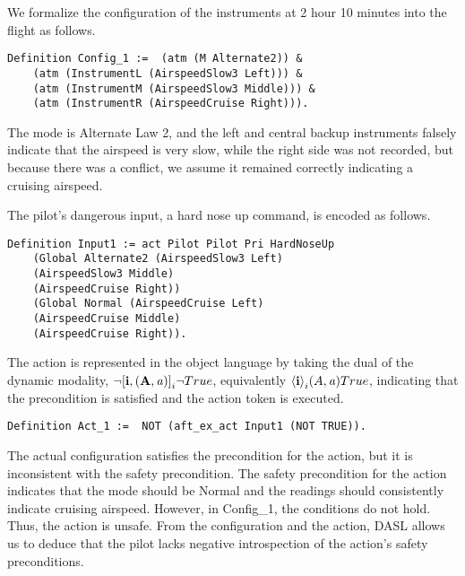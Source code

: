 We formalize the configuration of the instruments at 2 hour 10 minutes into the flight as follows.
\begin{tcolorbox}\begin{lstlisting}[language=Coq]
	Definition Config_1 :=  (atm (M Alternate2)) & 
	(atm (InstrumentL (AirspeedSlow3 Left))) & 
	(atm (InstrumentM (AirspeedSlow3 Middle))) & 
	(atm (InstrumentR (AirspeedCruise Right))).
	\end{lstlisting}\end{tcolorbox}
The mode is Alternate Law 2, and the left and central backup instruments falsely indicate that the airspeed is very slow, while the right side was not recorded, but because there was a conflict, we assume it remained correctly indicating a cruising airspeed.

The pilot's dangerous input, a hard nose up command, is encoded as follows.
\begin{tcolorbox}\begin{lstlisting}[language=Coq]
	Definition Input1 := act Pilot Pilot Pri HardNoseUp 
	(Global Alternate2 (AirspeedSlow3 Left) 
	(AirspeedSlow3 Middle) 
	(AirspeedCruise Right))
	(Global Normal (AirspeedCruise Left) 
	(AirspeedCruise Middle) 
	(AirspeedCruise Right)).
	\end{lstlisting}\end{tcolorbox}
The action is represented in the object language by taking the dual of the dynamic modality, ${\neg} \mathbf{[i,(A,\mathit{a})]}_i{\neg} True$, equivalently $\mathbf{\langle i\rangle}_i{(A,\mathit{a})}True$, indicating that the precondition is satisfied and the action token is executed.
\begin{tcolorbox}\begin{lstlisting}[language=Coq]
	Definition Act_1 :=  NOT (aft_ex_act Input1 (NOT TRUE)).
	\end{lstlisting}
\end{tcolorbox}
The actual configuration satisfies the precondition for the action, but it is inconsistent with the safety precondition. The safety precondition for the action indicates that the mode should be Normal and the readings should consistently indicate cruising airspeed. However, in Config\_1, the conditions do not hold. Thus, the action is unsafe. From the configuration and the action, DASL allows us to deduce that the pilot lacks negative introspection of the action's safety preconditions.

